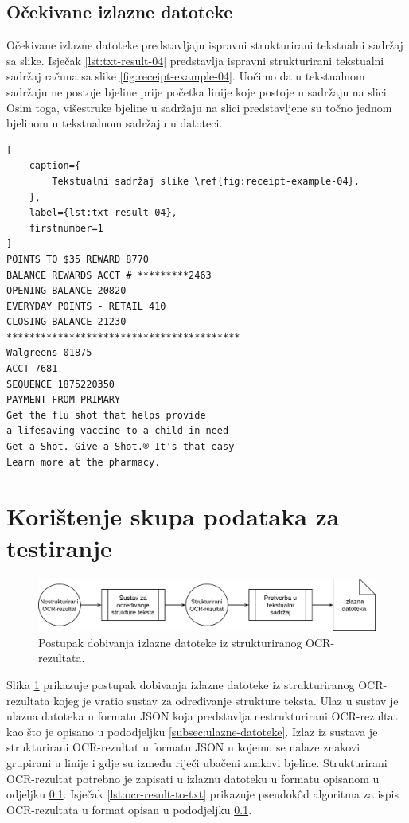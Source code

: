 \documentclass[times, utf8, zavrsni]{fer}
\begin{document}
\subsection{Očekivane izlazne datoteke}
\label{subsec:ocekivane-izlazne-datoteke}
Očekivane izlazne datoteke predstavljaju ispravni strukturirani tekstualni
sadržaj sa slike. Isječak \ref{lst:txt-result-04} predstavlja ispravni
strukturirani tekstualni sadržaj računa sa slike \ref{fig:receipt-example-04}.
Uočimo da u tekstualnom sadržaju ne postoje bjeline prije početka linije koje
postoje u sadržaju na slici. Osim toga, višestruke bjeline u sadržaju na slici
predstavljene su točno jednom bjelinom u tekstualnom sadržaju u datoteci.

\begin{lstlisting}[
    caption={
        Tekstualni sadržaj slike \ref{fig:receipt-example-04}.
    },
    label={lst:txt-result-04},
    firstnumber=1
]
POINTS TO $35 REWARD 8770
BALANCE REWARDS ACCT # *********2463
OPENING BALANCE 20820
EVERYDAY POINTS - RETAIL 410
CLOSING BALANCE 21230
*****************************************
Walgreens 01875
ACCT 7681
SEQUENCE 1875220350
PAYMENT FROM PRIMARY
Get the flu shot that helps provide
a lifesaving vaccine to a child in need
Get a Shot. Give a Shot.® It's that easy
Learn more at the pharmacy.
\end{lstlisting}








\section{Korištenje skupa podataka za testiranje}
\label{sec:koristenje-skupa-podataka-za-testiranje}
\begin{figure}[htb]
    \centering
    \captionsetup{justification=centering,margin=2cm}
    \includegraphics[width=\textwidth]{images/sustav-02.png}
    \caption{
        Postupak dobivanja izlazne datoteke iz strukturiranog OCR-rezultata.
    }
    \label{fig:sustav-02}
\end{figure}
Slika \ref{fig:sustav-02} prikazuje postupak dobivanja izlazne datoteke iz
strukturiranog OCR-rezultata kojeg je vratio sustav za određivanje strukture
teksta. Ulaz u sustav je ulazna datoteka u formatu JSON koja predstavlja
nestrukturirani OCR-rezultat kao što je opisano u pododjeljku
\ref{subsec:ulazne-datoteke}. Izlaz iz sustava je strukturirani OCR-rezultat u
formatu JSON u kojemu se nalaze znakovi grupirani u linije i gdje su između
riječi ubačeni znakovi bjeline. Strukturirani OCR-rezultat potrebno je zapisati
u izlaznu datoteku u formatu opisanom u odjeljku
\ref{subsec:ocekivane-izlazne-datoteke}. Isječak \ref{lst:ocr-result-to-txt}
prikazuje pseudokôd algoritma za ispis OCR-rezultata u format opisan u
pododjeljku \ref{subsec:ocekivane-izlazne-datoteke}.
\end{document}
